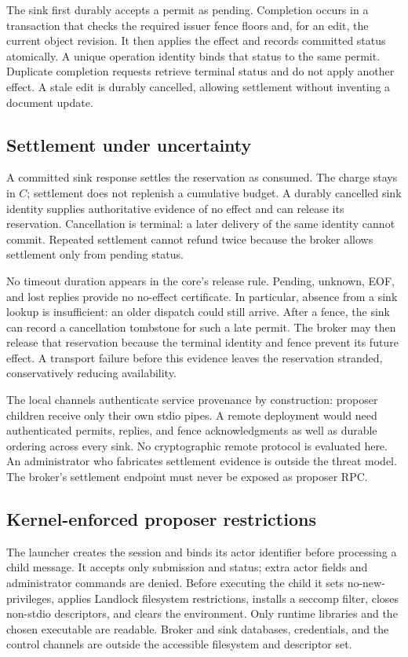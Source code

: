 The sink first durably accepts a permit as pending. Completion occurs in a
transaction that checks the required issuer fence floors and, for an edit,
the current object revision. It then applies the effect and records committed
status atomically. A unique operation identity binds that status to the same
permit. Duplicate completion requests retrieve terminal status and do not apply
another effect. A stale edit is durably cancelled, allowing settlement without
inventing a document update.

\subsection{Settlement under uncertainty}
A committed sink response settles the reservation as consumed. The charge stays
in $C$; settlement does not replenish a cumulative budget. A durably cancelled
sink identity supplies authoritative evidence of no effect and can release its
reservation. Cancellation is terminal: a later delivery of the same identity
cannot commit. Repeated settlement cannot refund twice because the broker
allows settlement only from pending status.

No timeout duration appears in the core's release rule. Pending, unknown,
EOF, and lost replies provide no no-effect certificate. In particular, absence
from a sink lookup is insufficient: an older dispatch could still arrive.
After a fence, the sink can record a cancellation tombstone for such a late
permit. The broker may then release that reservation because the terminal
identity and fence prevent its future effect. A transport failure before this
evidence leaves the reservation stranded, conservatively reducing availability.

The local channels authenticate service provenance by construction: proposer
children receive only their own stdio pipes. A remote deployment would need
authenticated permits, replies, and fence acknowledgments as well as durable
ordering across every sink. No cryptographic remote protocol is evaluated here.
An administrator who fabricates settlement evidence is outside the threat
model. The broker's settlement endpoint must never be exposed as proposer RPC.

\subsection{Kernel-enforced proposer restrictions}
The launcher creates the session and binds its actor identifier before
processing a child message. It accepts only submission and status; extra actor
fields and administrator commands are denied. Before executing the child it
sets no-new-privileges, applies Landlock filesystem restrictions, installs a
seccomp filter, closes non-stdio descriptors, and clears the environment.
Only runtime libraries and the chosen executable are readable. Broker and sink
databases, credentials, and the control channels are outside the accessible
filesystem and descriptor set.

